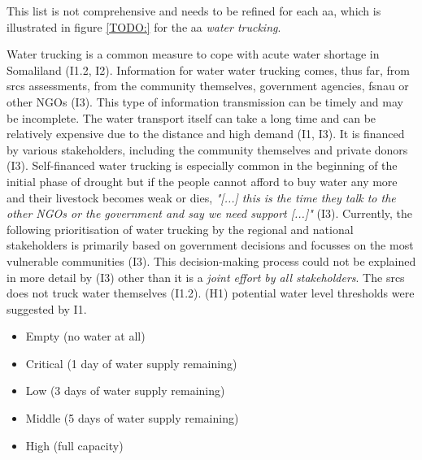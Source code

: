 
This list is not comprehensive and needs to be refined for each \acrshort{aa}, which is illustrated in figure \ref*{TODO:} for the \acrshort{aa} \textit{water trucking}.


Water trucking is a common measure to cope with acute water shortage in Somaliland (I1.2, I2). Information for water water trucking comes, thus far, from \acrshort{srcs} assessments, from the community themselves, government agencies, \acrshort{fsnau} or other NGOs (I3). This type of information transmission can be timely and may be incomplete. The water transport itself can take a long time and can be relatively expensive due to the distance and high demand (I1, I3). It is financed by various stakeholders, including the community themselves and private donors (I3). Self-financed water trucking is especially common in the beginning of the initial phase of drought but if the people cannot afford to buy water any more and their livestock becomes weak or dies, \textit{"[...] this is the time they talk to the other NGOs or the government and say we need support [...]"} (I3). Currently, the following prioritisation of water trucking by the regional and national stakeholders is primarily based on government decisions and focusses on the most vulnerable communities (I3). This decision-making process could not be explained in more detail by (I3) other than it is a \textit{joint effort by all stakeholders}. The \acrshort{srcs} does not truck water themselves (I1.2).\newline
(H1) potential water level thresholds were suggested by I1.
\begin{itemize}
    \item Empty (no water at all)
    \item Critical (1 day of water supply remaining)
    \item Low (3 days of water supply remaining)
    \item Middle (5 days of water supply remaining)
    \item High (full capacity)
\end{itemize}
